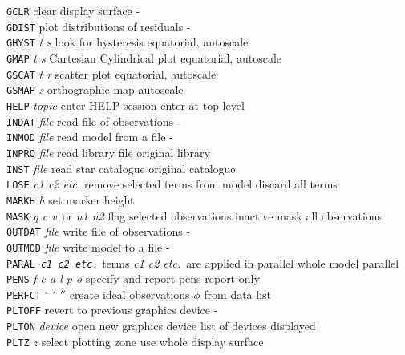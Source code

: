 {\begin{small}
\begin{tabs}
{\tt GCLR} \> clear display surface \> - \\
{\tt GDIST} \> plot distributions of residuals \> - \\
{\tt GHYST} {\it t s} \> look for hysteresis \> equatorial, autoscale \\
{\tt GMAP} {\it t s} \> Cartesian Cylindrical plot \> equatorial, autoscale \\
{\tt GSCAT} {\it t r} \> scatter plot \> equatorial, autoscale \\
{\tt GSMAP} {\it s} \> orthographic map \> autoscale \\
{\tt HELP} {\it topic} \> enter HELP session \> enter at top level \\
{\tt INDAT} {\it file} \> read file of observations \> - \\
{\tt INMOD} {\it file} \> read model from a file \> - \\
{\tt INPRO} {\it file} \> read library file \> original library \\
{\tt INST} {\it file} \> read star catalogue \> original catalogue \\
{\tt LOSE} {\it c1 c2 etc.} \> remove selected terms from model \>
                        discard all terms \\
{\tt MARKH} {\it h} \> set marker height  \\
{\tt MASK} {\it q c v}\, or {\it n1 n2} \>
                        flag selected observations inactive \>
                        mask all observations \\
{\tt OUTDAT} {\it file} \> write file of observations \> - \\
{\tt OUTMOD} {\it file} \> write model to a file \> - \\
{\tt PARAL {\it c1 c2 etc.}} \> terms
                        {\it c1 c2 etc.}\ are applied in parallel \>
                        whole model parallel \\
{\tt PENS} {\it f c a l p o} \> specify and report pens  \>
                        report only \\
{\tt PERFCT} {\it $^\circ$ $'$ $''$} \> create ideal observations \>
                        $\phi$ from data list \\
{\tt PLTOFF} \> revert to previous graphics device \> - \\
{\tt PLTON} {\it device} \> open new graphics device \>
                        list of devices displayed \\
{\tt PLTZ} {\it z} \> select plotting zone \>
                        use whole display surface \\

\end{tabs}
\end{small}}
